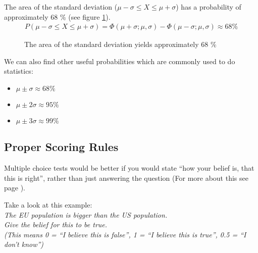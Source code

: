 The area of the standard deviation ($\mu - \sigma \leq X \leq \mu + \sigma$) has a probability of approximately 68 \% (see figure \ref{fig:2014-05-09-std}).
\begin{align*}
P(\mu - \sigma \leq X \leq \mu + \sigma) = \Phi(\mu+\sigma;\mu,\sigma) - \Phi(\mu-\sigma;\mu,\sigma) \approx 68 \%
\end{align*}

\begin{figure}[!ht]
\centering
{}
\caption{The area of the standard deviation yields approximately 68 \%}
\label{fig:2014-05-09-std}
\end{figure}

\begin{samepage}
We can also find other useful probabilities which are commonly used to do statistics:
\begin{itemize}
	\item $\mu \pm \sigma \approx 68\%$
	\item $\mu \pm 2\sigma \approx 95\%$
	\item $\mu \pm 3\sigma \approx 99\%$
\end{itemize}
\end{samepage}


\subsection{Proper Scoring Rules}
Multiple choice tests would be better if you would state ``how your belief is, that this is right'', rather than just answering the question (For more about this see page \pageref{ex4_4_solution}).

\bigskip

Take a look at this example: \\ \textit{The EU population is bigger than the US population. \\
Give the belief for this to be true. \\(This means 0 = ``I believe this is false'', 1 = ``I believe this is true'', 0.5 = ``I don't know'')}

